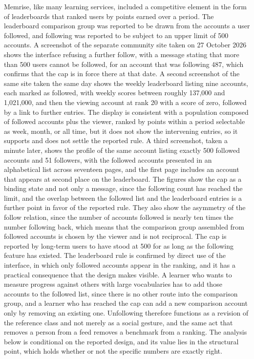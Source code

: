 \documentclass[11pt]{article}
\theoremstyle{remark}
\begin{document}
Memrise, like many learning services, included a competitive element in the form of leaderboards that ranked users by points earned over a period. The leaderboard comparison group was reported to be drawn from the accounts a user followed, and following was reported to be subject to an upper limit of 500 accounts. A screenshot of the separate community site taken on 27 October 2026 shows the interface refusing a further follow, with a message stating that more than 500 users cannot be followed, for an account that was following 487, which confirms that the cap is in force there at that date. A second screenshot of the same site taken the same day shows the weekly leaderboard listing nine accounts, each marked as followed, with weekly scores between roughly 137,000 and 1,021,000, and then the viewing account at rank 20 with a score of zero, followed by a link to further entries. The display is consistent with a population composed of followed accounts plus the viewer, ranked by points within a period selectable as week, month, or all time, but it does not show the intervening entries, so it supports and does not settle the reported rule. A third screenshot, taken a minute later, shows the profile of the same account listing exactly 500 followed accounts and 51 followers, with the followed accounts presented in an alphabetical list across seventeen pages, and the first page includes an account that appears at second place on the leaderboard. The figures show the cap as a binding state and not only a message, since the following count has reached the limit, and the overlap between the followed list and the leaderboard entries is a further point in favor of the reported rule. They also show the asymmetry of the follow relation, since the number of accounts followed is nearly ten times the number following back, which means that the comparison group assembled from followed accounts is chosen by the viewer and is not reciprocal. The cap is reported by long-term users to have stood at 500 for as long as the following feature has existed. The leaderboard rule is confirmed by direct use of the interface, in which only followed accounts appear in the ranking, and it has a practical consequence that the design makes visible. A learner who wants to measure progress against others with large vocabularies has to add those accounts to the followed list, since there is no other route into the comparison group, and a learner who has reached the cap can add a new comparison account only by removing an existing one. Unfollowing therefore functions as a revision of the reference class and not merely as a social gesture, and the same act that removes a person from a feed removes a benchmark from a ranking. The analysis below is conditional on the reported design, and its value lies in the structural point, which holds whether or not the specific numbers are exactly right.
\end{document}
